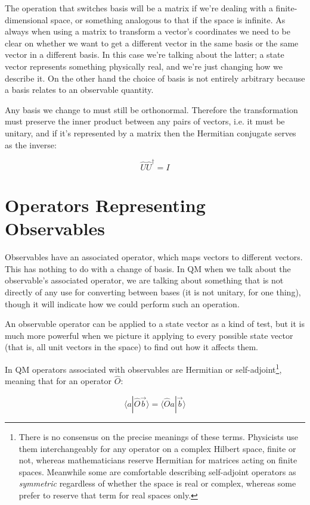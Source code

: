 The operation that switches basis will be a matrix if we're dealing with a finite-dimensional space, or something analogous to that if the space is infinite. As always when using a matrix to transform a vector's coordinates we need to be clear on whether we want to get a different vector in the same basis or the same vector in a different basis. In this case we're talking about the latter; a state vector represents something physically real, and we're just changing how we describe it. On the other hand the choice of basis is not entirely arbitrary because a basis relates to an observable quantity.

Any basis we change to must still be orthonormal. Therefore the transformation must preserve the inner product between any pairs of vectors, i.e. it must be unitary, and if it's represented by a matrix then the Hermitian conjugate serves as the inverse:

$$\hat{U} \hat{U}^\dagger = I$$

\section{Operators Representing Observables} \label{sec:qm-operators1}

Observables have an associated operator, which maps vectors to different vectors. This has nothing to do with a change of basis. In QM when we talk about the observable's associated operator, we are talking about something that is not directly of any use for converting between bases (it is not unitary, for one thing), though it will indicate how we could perform such an operation.

An observable operator can be applied to a state vector as a kind of test, but it is much more powerful when we picture it applying to every possible state vector (that is, all unit vectors in the space) to find out how it affects them.

In QM operators associated with observables are Hermitian or self-adjoint\footnote{There is no consensus on the precise meanings of these terms. Physicists use them interchangeably for any operator on a complex Hilbert space, finite or not, whereas mathematicians reserve Hermitian for matrices acting on finite spaces. Meanwhile some are comfortable describing self-adjoint operators as \textit{symmetric} regardless of whether the space is real or complex, whereas some prefer to reserve that term for real spaces only.}, meaning that for an operator $\hat{O}$:

$$\langle a|\hat{O} \vec{b} \rangle = \langle \hat{O} a| \vec{b} \rangle$$

